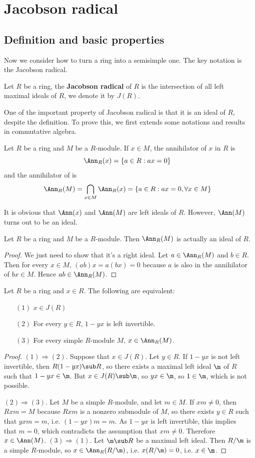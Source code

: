 \section{Jacobson radical}
\subsection{Definition and basic properties}
Now we consider how to turn a ring into a semisimple one. The key notation is the Jacobson radical.
\begin{definition}
Let $R$ be a ring, the \textbf{Jacobson radical} of $R$ is the intersection of all left maximal ideals of $R$, we denote it by $J(R)$.
\end{definition}
One of the important property of Jacobson radical is that it is an ideal of $R$, despite the definition. To prove this, we first extends some notations and results in commutative algebra.
\begin{definition}
Let $R$ be a ring and $M$ be a $R$-module. If $x\in M$, the annihilator of $x$ in $R$ is
\[\Ann_R(x)=\{a\in R:ax=0\}\]
and the annihilator of is
\[\Ann_R(M)=\bigcap_{x\in M}\Ann_R(x)=\{a\in R:ax=0,\forall x\in M\}\]
\end{definition}
It is obvious that $\Ann(x)$ and $\Ann(M)$ are left ideals of $R$. However, $\Ann(M)$ turns out to be an ideal.
\begin{proposition}
Let $R$ be a ring and $M$ be a $R$-module. Then $\Ann_R(M)$ is actually an ideal of $R$.
\end{proposition}
\begin{proof}
We just need to show that it's a right ideal. Let $a\in\Ann_R(M)$ and $b\in R$. Then for every $x\in M$, $(ab)x=a(bx)=0$ because $a$ is also in the annihilator of $bx\in M$. Hence $ab\in\Ann_R(M)$.
\end{proof}
\begin{proposition}\label{Jacobson rad iff}
Let $R$ be a ring and $x\in R$. The following are equivalent:
\begin{itemize}
\item[$(1)$] $x\in J(R)$
\item[$(2)$] For every $y\in R$, $1-yx$ is left invertible.
\item[$(3)$] For every simple $R$-module $M$, $x\in\Ann_R(M)$.
\end{itemize}
\end{proposition}
\begin{proof}
$(1)\Rightarrow(2)$. Suppose that $x\in J(R)$. Let $y\in R$. If $1-yx$ is not left invertible, then $R(1-yx)\sub R$, so there exists a maximal left ideal $\m$ of $R$ such that $1-yx\in\m$. But $x\in J(R)\sub\m$, so $yx\in\m$, so $1\in\m$, which is not possible.\par
$(2)\Rightarrow(3)$. Let $M$ be a simple $R$-module, and let $m\in M$. If $xm\neq0$, then $Rxm=M$ because $Rxm$ is a nonzero submodule of $M$, so there exists $y\in R$ such that $yxm=m$, i.e. $(1-yx)m=m$. As $1-yx$ is left invertible, this implies that $m=0$, which contradicts the assumption that $xm\neq0$. Therefore $x\in\Ann(M)$.
$(3)\Rightarrow(1)$. Let $\m\sub R$ be a maximal left ideal. Then $R/\m$ is a simple $R$-module, so $x\in\Ann_R(R/\m)$, i.e. $x(R/\m)=0$, i.e. $x\in\m$.
\end{proof}
